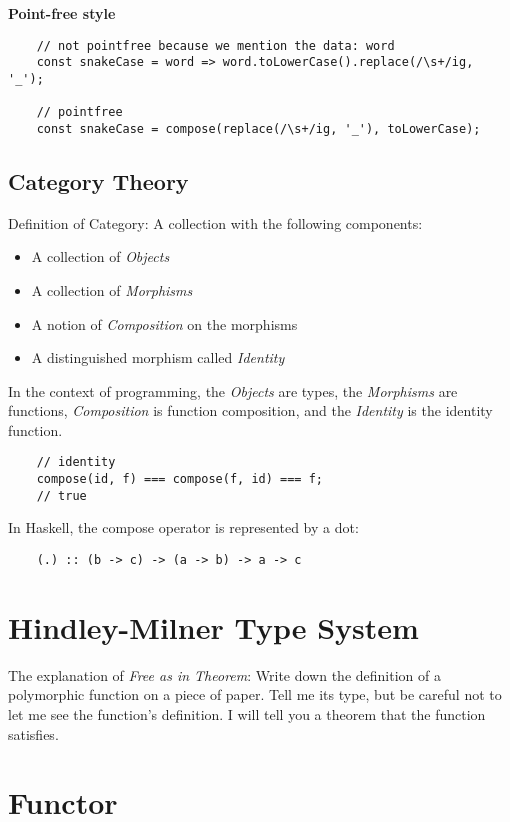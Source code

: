 \documentclass[UTF8]{ctexart}
\begin{document}
\textbf{Point-free style}
\begin{lstlisting}
    // not pointfree because we mention the data: word
    const snakeCase = word => word.toLowerCase().replace(/\s+/ig, '_');

    // pointfree
    const snakeCase = compose(replace(/\s+/ig, '_'), toLowerCase);
\end{lstlisting}

\subsection{Category Theory}
Definition of Category: A collection with the following components:
\begin{itemize}
    \item A collection of \textit{Objects}
    \item A collection of \textit{Morphisms}
    \item A notion of \textit{Composition} on the morphisms
    \item A distinguished morphism called \textit{Identity}
\end{itemize}

In the context of programming,
the \textit{Objects} are types,
the \textit{Morphisms} are functions,
\textit{Composition} is function composition,
and the \textit{Identity} is the identity function.

\begin{lstlisting}
    // identity
    compose(id, f) === compose(f, id) === f;
    // true
\end{lstlisting}

In Haskell, the compose operator is represented by a dot:
\begin{lstlisting}
    (.) :: (b -> c) -> (a -> b) -> a -> c
\end{lstlisting}

\section{Hindley-Milner Type System}

The explanation of \textit{Free as in Theorem}:
Write down the definition of a polymorphic function on a piece of paper.
Tell me its type, but be careful not to let me see the function's definition.
I will tell you a theorem that the function satisfies.

\section{Functor}
\end{document}
